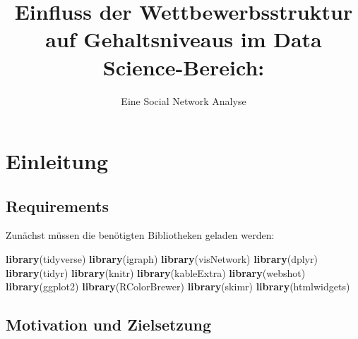 \documentclass[
]{article}
\title{Einfluss der Wettbewerbsstruktur auf Gehaltsniveaus im Data
Science-Bereich:}
\subtitle{Eine Social Network Analyse}
\author{}
\date{\vspace{-2.5em}}
\newenvironment{Shaded}{\begin{snugshade}}{\end{snugshade}}
\newcommand{\FunctionTok}[1]{\textcolor[rgb]{0.13,0.29,0.53}{\textbf{#1}}}
\newcommand{\NormalTok}[1]{#1}
\begin{document}
\maketitle

{
\setcounter{tocdepth}{3}
\tableofcontents
}
\newpage

\section{Einleitung}\label{einleitung}

\subsection{Requirements}\label{requirements}

Zunächst müssen die benötigten Bibliotheken geladen werden:

\begin{Shaded}
\begin{Highlighting}[]
\FunctionTok{library}\NormalTok{(tidyverse)}
\FunctionTok{library}\NormalTok{(igraph)}
\FunctionTok{library}\NormalTok{(visNetwork)}
\FunctionTok{library}\NormalTok{(dplyr)}
\FunctionTok{library}\NormalTok{(tidyr)}
\FunctionTok{library}\NormalTok{(knitr)}
\FunctionTok{library}\NormalTok{(kableExtra)}
\FunctionTok{library}\NormalTok{(webshot)}
\FunctionTok{library}\NormalTok{(ggplot2)}
\FunctionTok{library}\NormalTok{(RColorBrewer)}
\FunctionTok{library}\NormalTok{(skimr)}
\FunctionTok{library}\NormalTok{(htmlwidgets)}
\end{Highlighting}
\end{Shaded}

\subsection{Motivation und
Zielsetzung}\label{motivation-und-zielsetzung}
\end{document}
